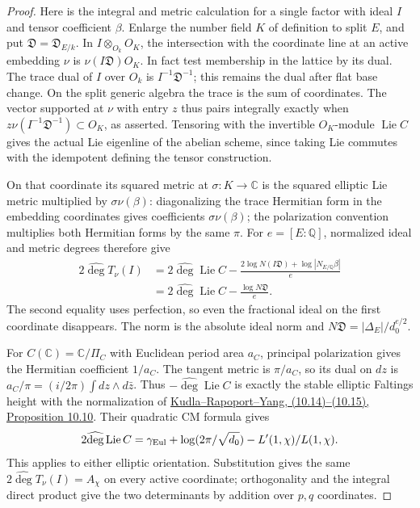 \begin{proof}
Here is the integral and metric calculation for a single factor
with ideal \(I\) and tensor coefficient \(\beta\). Enlarge the
number field \(K\) of definition to split \(E\), and put
\(\mathfrak D=\mathfrak D_{E/k}\). In
\(I\otimes_{O_k}O_K\), the intersection with the coordinate line
at an active embedding \(\nu\) is \(\nu(I\mathfrak D)O_K\).
In fact test membership in the lattice by its dual. The trace
dual of \(I\) over \(O_k\) is \(I^{-1}\mathfrak D^{-1}\);
this remains the dual after flat base change. On the split
generic algebra the trace is the sum of coordinates. The vector
supported at \(\nu\) with entry \(z\) thus pairs integrally
exactly when \(z\nu(I^{-1}\mathfrak D^{-1})\subset O_K\), as
asserted. Tensoring with the invertible \(O_K\)-module
\(\operatorname{Lie} C\) gives the actual Lie eigenline of the
abelian scheme, since taking Lie commutes with the idempotent
defining the tensor construction.

On that coordinate its squared metric at \(\sigma:K\to\mathbb C\)
is the squared elliptic Lie metric multiplied by
\(\sigma\nu(\beta)\): diagonalizing the trace Hermitian form in
the embedding coordinates gives coefficients \(\sigma\nu(\beta)\);
the polarization convention multiplies both Hermitian forms by
the same \(\pi\). For \(e=[E:\mathbb Q]\), normalized ideal and
metric degrees therefore give
\[
\begin{split}
 2\widehat{\deg}T_\nu(I)
 &=2\widehat{\deg}\operatorname{Lie}C
   -\frac{2\log N(I\mathfrak D)+\log|N_{E/\mathbb Q}\beta|}{e}\\
 &=2\widehat{\deg}\operatorname{Lie}C-\frac{\log N\mathfrak D}{e}.
\end{split}
\]
The second equality uses perfection, so even the fractional ideal
on the first coordinate disappears. The norm is the absolute
ideal norm and \(N\mathfrak D=|\Delta_E|/d_0^{e/2}\).

For \(C(\mathbb C)=\mathbb C/\Pi_C\) with Euclidean period area
\(a_C\), principal polarization gives the Hermitian coefficient
\(1/a_C\). The tangent metric is \(\pi/a_C\), so its dual on
\(dz\) is \(a_C/\pi=(i/2\pi)\int dz\wedge d\bar z\).
Thus \(-\widehat{\deg}\operatorname{Lie}C\) is exactly the
stable elliptic Faltings height with the normalization of
\href{https://people.math.wisc.edu/~tonghaiyang/KRY2.pdf}
{Kudla--Rapoport--Yang, (10.14)--(10.15), Proposition 10.10}.
Their quadratic CM formula gives
\[
 2\widehat{\deg}\operatorname{Lie}C
 =\gamma_{\rm Eul}+\log(2\pi/\sqrt{d_0})
                  - L'(1,\chi)/L(1,\chi).
\]
This applies to either elliptic orientation. Substitution gives
the same \(2\widehat{\deg}T_\nu(I)=A_\chi\) on every active
coordinate; orthogonality and the integral direct product give
the two determinants by addition over \(p,q\) coordinates.
\end{proof}

